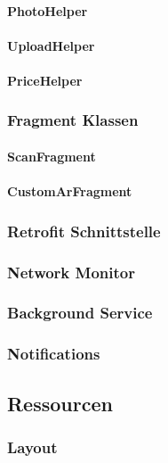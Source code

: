 \documentclass{scrartcl}
\begin{document}
\paragraph{PhotoHelper}

\paragraph{UploadHelper}

\paragraph{PriceHelper}

\subsubsection{Fragment Klassen}

\paragraph{ScanFragment}

\paragraph{CustomArFragment}

\subsubsection{Retrofit Schnittstelle}

\subsubsection{Network Monitor}

\subsubsection{Background Service}

\subsubsection{Notifications}

\subsection{Ressourcen}

\subsubsection{Layout}
\end{document}
